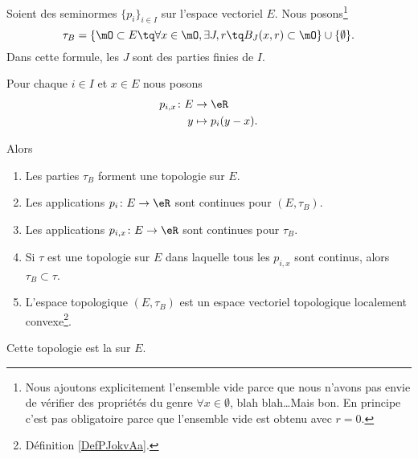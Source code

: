 \begin{propositionDef}      \label{DEFooZTKAooWYUyDa}
	Soient des seminormes \( \{ p_i \}_{i\in I}\) sur l'espace vectoriel \( E\). Nous posons\footnote{Nous ajoutons explicitement l'ensemble vide parce que nous n'avons pas envie de vérifier des propriétés du genre \( \forall x\in\emptyset\), blah blah\ldots Mais bon. En principe c'est pas obligatoire parce que l'ensemble vide est obtenu avec \( r=0\).}
	\begin{equation}		\label{EQooNHMNooGJSeOr}
		\tau_B=\{ \mO\subset E\tq \forall x\in\mO, \exists J,r\tq B_J(x,r)\subset \mO \}\cup\{ \emptyset \}.
	\end{equation}
	Dans cette formule, les \( J\) sont des parties finies de \( I\).

	Pour chaque \( i\in I\) et \( x\in E\) nous posons
	\begin{equation}
		\begin{aligned}
			p_{i,x}\colon E & \to \eR           \\
			y               & \mapsto p_i(y-x).
		\end{aligned}
	\end{equation}

	Alors
	\begin{enumerate}
		\item		\label{ITEMooQPVRooKyOBPi}
		      Les parties \( \tau_B\) forment une topologie sur \( E\).
		\item \label{ITEMooQIYWooAmPCdI}
		      Les applications \(p_i \colon E\to \eR  \) sont continues pour \( (E,\tau_B)\).
		\item		\label{ITEMooYGNWooYhBzSa}
		      Les applications \( p_{i,x} \colon E\to \eR  \) sont continues pour \( \tau_B\).
		\item		\label{ITEMooMUUZooBKBhsH}
		      Si \( \tau\) est une topologie sur \( E\) dans laquelle tous les \( p_{i,x}\) sont continus, alors \( \tau_B\subset\tau\).
		\item		\label{ITEMooEGVFooNqDkdN}
		      L'espace topologique \( (E,\tau_B)\) est un espace vectoriel topologique localement convexe\footnote{Définition \ref{DefPJokvAa}.}.
	\end{enumerate}

	Cette topologie est la  sur \( E\).
\end{propositionDef}

